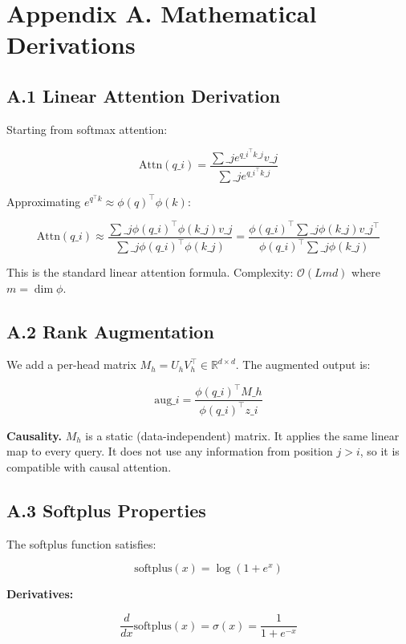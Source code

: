 
\section{Appendix A. Mathematical Derivations}

\subsection{A.1 Linear Attention Derivation}

Starting from softmax attention:

\[
\text{Attn}(q\_i) = \frac{\sum\_j e^{q\_i^\top k\_j} v\_j}{\sum\_j e^{q\_i^\top k\_j}}
\tag{A.1}
\]

Approximating $e^{q^\top k} \approx \phi(q)^\top \phi(k)$:

\[
\text{Attn}(q\_i) \approx \frac{\sum\_j \phi(q\_i)^\top \phi(k\_j) v\_j}{\sum\_j \phi(q\_i)^\top \phi(k\_j)}
= \frac{\phi(q\_i)^\top \sum\_j \phi(k\_j) v\_j^\top}{\phi(q\_i)^\top \sum\_j \phi(k\_j)}
\tag{A.2}
\]

This is the standard linear attention formula. Complexity: $\mathcal{O}(L m d)$ 
where $m = \dim \phi$.

\subsection{A.2 Rank Augmentation}

We add a per-head matrix $M_h = U_h V_h^\top \in \mathbb{R}^{d \times d}$. 
The augmented output is:

\[
\text{aug}\_i = \frac{\phi(q\_i)^\top M\_h}{\phi(q\_i)^\top z\_i}
\tag{A.3}
\]

\textbf{Causality.} $M_h$ is a static (data-independent) matrix. It applies the 
same linear map to every query. It does not use any information from position 
$j > i$, so it is compatible with causal attention.

\subsection{A.3 Softplus Properties}

The softplus function satisfies:

\[
\text{softplus}(x) = \log(1 + e^x)
\tag{A.4}
\]

\textbf{Derivatives:}

\[
\frac{d}{dx}\text{softplus}(x) = \sigma(x) = \frac{1}{1 + e^{-x}}
\tag{A.5}
\]

